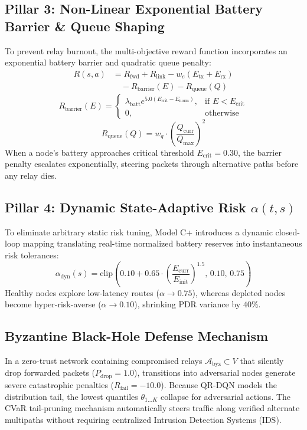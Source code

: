 \documentclass[conference]{IEEEtran}
\begin{document}
\subsection{Pillar 3: Non-Linear Exponential Battery Barrier \& Queue Shaping}
To prevent relay burnout, the multi-objective reward function incorporates an exponential battery barrier and quadratic queue penalty:
\begin{equation}
\begin{aligned}
R(s, a) &= R_{\text{fwd}} + R_{\text{link}} - w_e (E_{\text{tx}} + E_{\text{rx}}) \\
&\quad - R_{\text{barrier}}(E) - R_{\text{queue}}(Q)
\end{aligned}
\end{equation}
\begin{equation}
R_{\text{barrier}}(E) = \begin{cases} \lambda_{\text{batt}} e^{5.0(E_{\text{crit}} - E_{\text{norm}})}, & \text{if } E < E_{\text{crit}} \\ 0, & \text{otherwise} \end{cases}
\end{equation}
\begin{equation}
R_{\text{queue}}(Q) = w_q \cdot \left(\frac{Q_{\text{curr}}}{Q_{\text{max}}}\right)^2
\end{equation}
When a node's battery approaches critical threshold $E_{\text{crit}} = 0.30$, the barrier penalty escalates exponentially, steering packets through alternative paths before any relay dies.

\subsection{Pillar 4: Dynamic State-Adaptive Risk $\alpha(t, s)$}
To eliminate arbitrary static risk tuning, Model C+ introduces a dynamic closed-loop mapping translating real-time normalized battery reserves into instantaneous risk tolerances:
\begin{equation}
\alpha_{\text{dyn}}(s) = \text{clip}\left(0.10 + 0.65 \cdot \left(\frac{E_{\text{curr}}}{E_{\text{init}}}\right)^{1.5}, \, 0.10, \, 0.75\right)
\end{equation}
Healthy nodes explore low-latency routes ($\alpha \to 0.75$), whereas depleted nodes become hyper-risk-averse ($\alpha \to 0.10$), shrinking PDR variance by $40\%$.

\subsection{Byzantine Black-Hole Defense Mechanism}
In a zero-trust network containing compromised relays $\mathcal{A}_{\text{byz}} \subset V$ that silently drop forwarded packets ($P_{\text{drop}} = 1.0$), transitions into adversarial nodes generate severe catastrophic penalties ($R_{\text{fail}} = -10.0$). Because QR-DQN models the distribution tail, the lowest quantiles $\theta_{1\dots K}$ collapse for adversarial actions. The CVaR tail-pruning mechanism automatically steers traffic along verified alternate multipaths without requiring centralized Intrusion Detection Systems (IDS).
\end{document}
